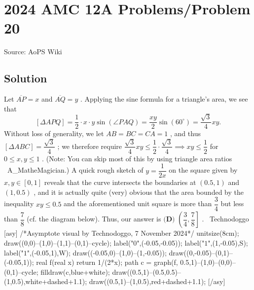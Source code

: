 \documentclass[12pt]{article}
\begin{document}
\section*{{2024 AMC 12A Problems/Problem 20}}
Source: AoPS Wiki

\subsection*{Solution}
Let $\overline{AP}=x$ and $\overline{AQ}=y$ . Applying the sine formula for a triangle's area, we see that \[[\Delta APQ]=\dfrac12\cdot x\cdot y\sin(\angle PAQ)=\dfrac{xy}2\sin(60^\circ)=\dfrac{\sqrt3}4xy.\] Without loss of generality, we let $AB=BC=CA=1$ , and thus $[\Delta ABC]=\dfrac{\sqrt3}4$ ; we therefore require $\dfrac{\sqrt3}4xy\le\dfrac12\cdot\dfrac{\sqrt3}4\implies xy\le\dfrac12$ for $0\le x,y\le1$ . (Note: You can skip most of this by using triangle area ratios ~A_MatheMagician.) A quick rough sketch of $y=\dfrac1{2x}$ on the square given by $x,y\in[0,1]$ reveals that the curve intersects the boundaries at $(0.5,1)$ and $(1,0.5)$ , and it is actually quite (very) obvious that the area bounded by the inequality $xy\le0.5$ and the aforementioned unit square is more than $\dfrac34$ but less than $\dfrac78$ (cf. the diagram below). Thus, our answer is $\boxed{\textbf{(D) }\left(\dfrac34,\dfrac78\right]}$ . ~Technodoggo [asy] /*Asymptote visual by Technodoggo, 7 November 2024*/ unitsize(8cm); draw((0,0)--(1,0)--(1,1)--(0,1)--cycle); label("$0$",(-0.05,-0.05)); label("$1$",(1,-0.05),S); label("$1$",(-0.05,1),W); draw((-0.05,0)--(1,0)--(1,-0.05)); draw((0,-0.05)--(0,1)--(-0.05,1)); real f(real x) {return 1/(2*x);} path c = graph(f, 0.5,1)--(1,0)--(0,0)--(0,1)--cycle; filldraw(c,blue+white); draw((0.5,1)--(0.5,0.5)--(1,0.5),white+dashed+1.1); draw((0.5,1)--(1,0.5),red+dashed+1.1); [/asy]
\end{document}
